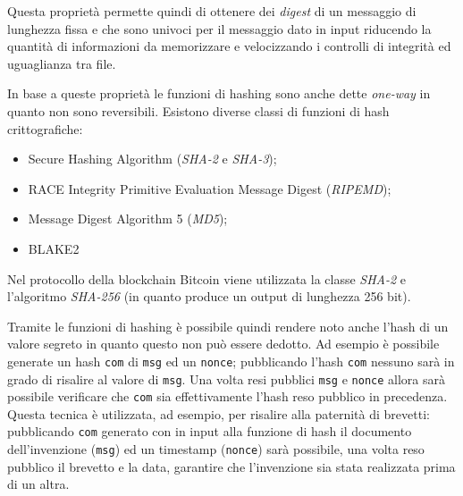 Questa proprietà permette quindi di ottenere dei \textit{digest} di un messaggio di lunghezza fissa e che sono univoci per il messaggio dato in input riducendo la quantità di informazioni da memorizzare e velocizzando i controlli di integrità ed uguaglianza tra file.

In base a queste proprietà le funzioni di hashing sono anche dette \textit{one-way} in quanto non sono reversibili.\newline\newline
Esistono diverse classi di funzioni di hash crittografiche:
\begin{itemize}
    \item Secure Hashing Algorithm (\textit{SHA-2} e \textit{SHA-3});
    \item RACE Integrity Primitive  Evaluation Message Digest (\textit{RIPEMD});
    \item Message Digest Algorithm 5 (\textit{MD5});
    \item BLAKE2
\end{itemize}

Nel protocollo della blockchain Bitcoin viene utilizzata la classe \textit{SHA-2} e l'algoritmo \textit{SHA-256} (in quanto produce un output di lunghezza 256 bit).
\begin{table}
    \caption{Confronto tra \textit{SHA-256} di due stringhe simili}
    \centering
\end{table}
Tramite le funzioni di hashing è possibile quindi rendere noto anche l'hash di un valore segreto in quanto questo non può essere dedotto. Ad esempio è possibile generate un hash \texttt{com} di \texttt{msg} ed un \texttt{nonce}; pubblicando l'hash \texttt{com} nessuno sarà in grado di risalire al valore di \texttt{msg}. Una volta resi pubblici \texttt{msg} e \texttt{nonce} allora sarà possibile verificare che \texttt{com} sia effettivamente l'hash reso pubblico in precedenza.\newline
Questa tecnica è utilizzata, ad esempio, per risalire alla paternità di brevetti: pubblicando \texttt{com} generato con in input alla funzione di hash il documento dell'invenzione (\texttt{msg}) ed un timestamp (\texttt{nonce}) sarà possibile, una volta reso pubblico il brevetto e la data, garantire che l'invenzione sia stata realizzata prima di un altra.

